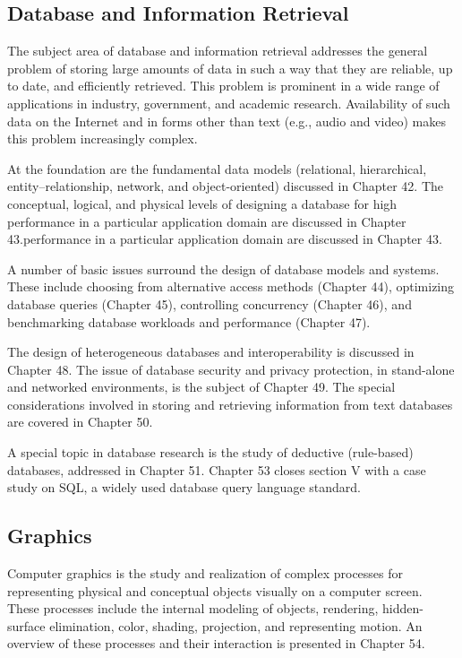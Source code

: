 \subsection{Database and Information Retrieval}

The subject area of database and information retrieval addresses
the general problem of storing large amounts of data in such a
way that they are reliable, up to date, and efficiently
retrieved. This problem is prominent in a wide range of
applications in industry, government, and academic research.
Availability of such data on the Internet and in forms other than
text (e.g., audio and video) makes this problem increasingly complex.

At the foundation are the fundamental data models (relational,
hierarchical, entity--relationship, network, and
object-oriented) discussed in Chapter 42. The conceptual,
logical, and physical levels of designing a database for high
performance in a particular application domain are discussed in
Chapter 43.performance in a particular application domain are discussed in
Chapter 43.


A number of basic issues surround the design of database models
and systems. These include choosing from alternative access
methods (Chapter 44), optimizing database queries (Chapter 45),
controlling concurrency (Chapter 46), and benchmarking database
workloads and performance (Chapter 47).

The design of heterogeneous databases and interoperability is
discussed in Chapter 48. The issue of database security and
privacy protection, in stand-alone and networked environments, is
the subject of Chapter 49. The special considerations involved
in storing and retrieving information from text databases are
covered in Chapter 50.

A special topic in database research is the study of deductive
(rule-based) databases, addressed in Chapter 51. Chapter 53
closes section V with a case study on SQL, a widely used database
query language standard.

\subsection{Graphics}

Computer graphics is the study and realization of complex
processes for representing physical and conceptual objects
visually on a computer screen. These processes include the
internal modeling of objects, rendering, hidden-surface
elimination, color, shading, projection, and representing motion.
An overview of these processes and their interaction is
presented in Chapter 54.

